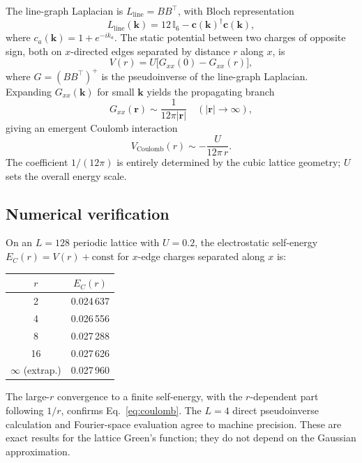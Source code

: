 \documentclass[aps,prb,twocolumn,superscriptaddress,showpacs]{revtex4-2}
\begin{document}
The line-graph Laplacian is $L_{\mathrm{line}}=BB^\top$, with Bloch
representation
\begin{equation}
L_{\mathrm{line}}(\mathbf{k}) = 12\,\mathbb{I}_6 -
\mathbf{c}(\mathbf{k})^\dagger\mathbf{c}(\mathbf{k}),
\end{equation}
where $c_a(\mathbf{k})=1+e^{-ik_a}$. The static potential between
two charges of opposite sign, both on $x$-directed edges separated
by distance $r$ along $x$, is
\begin{equation}
V(r) = U\bigl[G_{xx}(0)-G_{xx}(r)\bigr],
\end{equation}
where $G=(BB^\top)^+$ is the pseudoinverse of the line-graph Laplacian.
Expanding $G_{xx}(\mathbf{k})$ for small $\mathbf{k}$ yields the
propagating branch
\begin{equation}
G_{xx}(\mathbf{r}) \sim \frac{1}{12\pi|\mathbf{r}|}
\quad(|\mathbf{r}|\to\infty),
\end{equation}
giving an emergent Coulomb interaction
\begin{equation}
V_{\mathrm{Coulomb}}(r) \sim -\frac{U}{12\pi\,r}.
\label{eq:coulomb}
\end{equation}
The coefficient $1/(12\pi)$ is entirely determined by the cubic lattice
geometry; $U$ sets the overall energy scale.

\subsection{Numerical verification}

On an $L=128$ periodic lattice with $U=0.2$, the electrostatic
self-energy $E_C(r)=V(r)+\text{const}$ for $x$-edge charges separated
along $x$ is:

\begin{center}
\begin{tabular}{cc}
\toprule
$r$ & $E_C(r)$ \\
\midrule
2 & 0.024\,637 \\
4 & 0.026\,556 \\
8 & 0.027\,288 \\
16 & 0.027\,626 \\
$\infty$ (extrap.) & 0.027\,960 \\
\bottomrule
\end{tabular}
\end{center}

The large-$r$ convergence to a finite self-energy, with the
$r$-dependent part following $1/r$, confirms Eq.~\eqref{eq:coulomb}.
The $L=4$ direct pseudoinverse calculation and Fourier-space
evaluation agree to machine precision. These are exact results for the
lattice Green's function; they do not depend on the Gaussian approximation.
\end{document}
